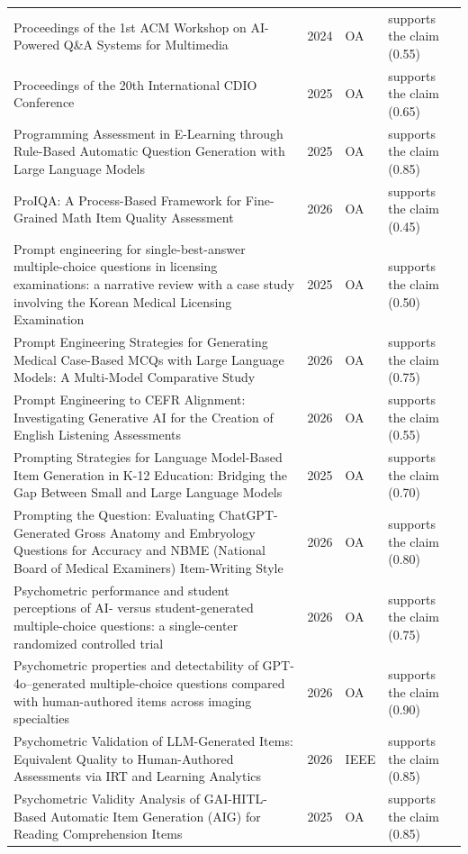 \begin{longtable}{@{}%
  >{\raggedright\arraybackslash}p{}c%
  >{\raggedright\arraybackslash}p{}%
  >{\raggedright\arraybackslash}p{}@{}}
Proceedings of the 1st ACM Workshop on AI-Powered Q\&A Systems for Multimedia & 2024 & OA & supports the claim (0.55) \\
Proceedings of the 20th International CDIO Conference & 2025 & OA & supports the claim (0.65) \\
Programming Assessment in E-Learning through Rule-Based Automatic Question Generation with Large Language Models & 2025 & OA & supports the claim (0.85) \\
ProIQA: A Process-Based Framework for Fine-Grained Math Item Quality Assessment & 2026 & OA & supports the claim (0.45) \\
Prompt engineering for single-best-answer multiple-choice questions in licensing examinations: a narrative review with a case study involving the Korean Medical Licensing Examination & 2025 & OA & supports the claim (0.50) \\
Prompt Engineering Strategies for Generating Medical Case-Based MCQs with Large Language Models: A Multi-Model Comparative Study & 2026 & OA & supports the claim (0.75) \\
Prompt Engineering to CEFR Alignment: Investigating Generative AI for the Creation of English Listening Assessments & 2026 & OA & supports the claim (0.55) \\
Prompting Strategies for Language Model-Based Item Generation in K-12 Education: Bridging the Gap Between Small and Large Language Models & 2025 & OA & supports the claim (0.70) \\
Prompting the Question: Evaluating ChatGPT-Generated Gross Anatomy and Embryology Questions for Accuracy and NBME (National Board of Medical Examiners) Item-Writing Style & 2026 & OA & supports the claim (0.80) \\
Psychometric performance and student perceptions of AI- versus student-generated multiple-choice questions: a single-center randomized controlled trial & 2026 & OA & supports the claim (0.75) \\
Psychometric properties and detectability of GPT-4o--generated multiple-choice questions compared with human-authored items across imaging specialties & 2026 & OA & supports the claim (0.90) \\
Psychometric Validation of LLM-Generated Items: Equivalent Quality to Human-Authored Assessments via IRT and Learning Analytics & 2026 & IEEE & supports the claim (0.85) \\
Psychometric Validity Analysis of GAI-HITL-Based Automatic Item Generation (AIG) for Reading Comprehension Items & 2025 & OA & supports the claim (0.85) \\

\end{longtable}
